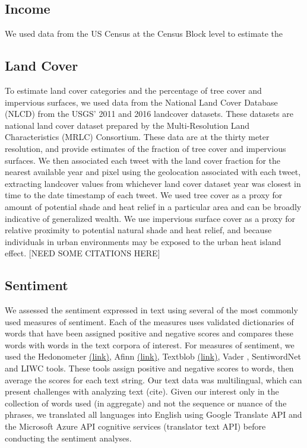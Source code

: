 \documentclass{article}
\begin{document}
\subsection{Income}
We used data from the US Census at the Census Block level to estimate the 

\subsection{Land Cover}
To estimate land cover categories and the percentage of tree cover and impervious surfaces, we used data from the National Land Cover Database (NLCD) from the USGS' 2011  \cite{homer_completion_2015} and 2016 \cite{yang_new_2018} landcover datasets. These datasets are national land cover dataset prepared by the Multi-Resolution Land Characteristics (MRLC) Consortium.  These data are at the thirty meter resolution, and provide estimates of the fraction of tree cover and impervious surfaces.  We then associated each tweet with the land cover fraction for the nearest available year and pixel using the geolocation associated with each tweet, extracting landcover values from whichever land cover dataset year was closest in time to the date timestamp of each tweet. We used tree cover as a proxy for amount of potential shade and heat relief in a particular area and can be broadly indicative of generalized wealth. We use impervious surface cover as a proxy for relative proximity to potential natural shade and heat relief, and because individuals in urban environments may be exposed to the urban heat island effect. [NEED SOME CITATIONS HERE] 

\subsection{Sentiment}
We assessed the sentiment expressed in text using several of the most commonly used measures of sentiment. Each of the measures uses validated dictionaries of words that have been assigned positive and negative scores and compares these words with words in the text corpora of interest. For measures of sentiment, we used the Hedonometer \href{https://hedonometer.org/timeseries/en_all/}{(link)}, Afinn \href{http://corpustext.com/reference/sentiment_afinn.html}{(link)}, Textblob \href{https://textblob.readthedocs.io/en/dev/}{(link)}, Vader , SentiwordNet and LIWC tools. These tools assign positive and negative scores to words, then average the scores for each text string. Our text data was multilingual, which can present challenges with analyzing text (cite). Given our interest only in the collection of words used (in aggregate) and not the sequence or nuance of the phrases, we translated all languages into English using Google Translate API and the Microsoft Azure API cognitive services (translator text API) before conducting the sentiment analyses.
\end{document}
